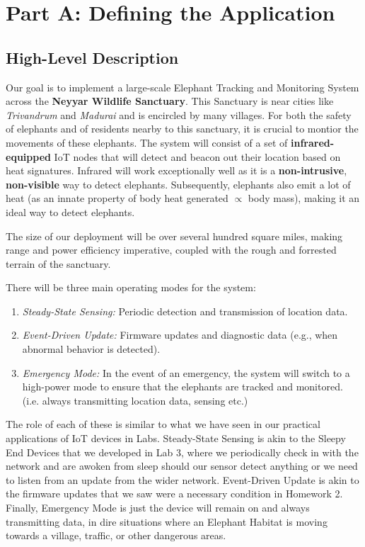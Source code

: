 \section{Part A: Defining the Application}
\subsection{High-Level Description}
Our goal is to implement a large-scale Elephant Tracking and Monitoring System across the \textbf{Neyyar Wildlife Sanctuary}. This Sanctuary is near cities like \textit{Trivandrum} and \textit{Madurai} and is encircled by many villages. For both the safety of elephants and of residents nearby to this sanctuary, it is crucial to montior the movements of these elephants. The system will consist of a set of \textbf{infrared-equipped} IoT nodes that will detect and beacon out their location based on heat signatures. Infrared will work exceptionally well as it is a \textbf{non-intrusive}, \textbf{non-visible} way to detect elephants. Subsequently, elephants also emit a lot of heat (as an innate property of body heat generated $\propto$ body mass), making it an ideal way to detect elephants.

The size of our deployment will be over several hundred square miles, making range and power efficiency imperative, coupled with the rough and forrested terrain of the sanctuary. 

There will be three main operating modes for the system: 
\begin{enumerate}
    \item \textit{Steady-State Sensing:} Periodic detection and transmission of location data.
    \item \textit{Event-Driven Update:} Firmware updates and diagnostic data (e.g., when abnormal behavior is detected).
    \item \textit{Emergency Mode:} In the event of an emergency, the system will switch to a high-power mode to ensure that the elephants are tracked and monitored. (i.e. always transmitting location data, sensing etc.)
\end{enumerate}

The role of each of these is similar to what we have seen in our practical applications of IoT devices in Labs. Steady-State Sensing is akin to the Sleepy End Devices that we developed in Lab 3, where we periodically check in with the network and are awoken from sleep should our sensor detect anything or we need to listen from an update from the wider network. Event-Driven Update is akin to the firmware updates that we saw were a necessary condition in Homework 2. Finally, Emergency Mode is just the device will remain on and always transmitting data, in dire situations where an Elephant Habitat is moving towards a village, traffic, or other dangerous areas.

